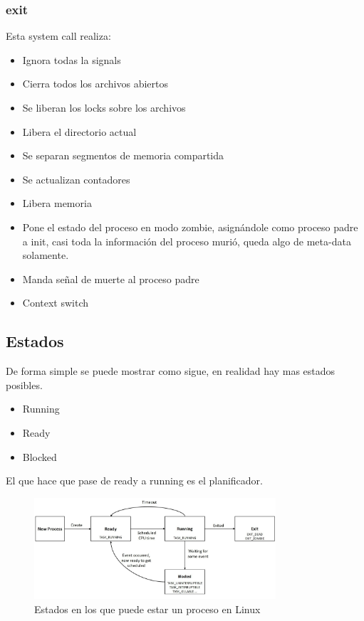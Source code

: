 \documentclass[titlepage,a4paper]{article}
\begin{document}
\subsubsection*{exit}
Esta system call realiza:
\begin{itemize}
    \item Ignora todas la signals
    \item Cierra todos los archivos abiertos
    \item Se liberan los locks sobre los archivos
    \item Libera el directorio actual
    \item Se separan segmentos de memoria compartida
    \item Se actualizan contadores
    \item Libera memoria
    \item Pone el estado del proceso en modo zombie, asignándole como proceso padre a init, casi toda la información del proceso murió, queda algo de meta-data solamente.
    \item Manda señal de muerte al proceso padre 
    \item Context switch
\end{itemize}



\subsection*{Estados}
De forma simple se puede mostrar como sigue, en realidad hay mas estados posibles.
\begin{itemize}
    \item Running
    \item Ready
    \item Blocked
\end{itemize}

El que hace que pase de ready a running es el planificador.

\begin{figure}[!htb]
    \centering
    \includegraphics[width=0.8\textwidth]{ImagenesApunte/EstadosLinux.png}
    \caption{Estados en los que puede estar un proceso en Linux}
\end{figure}
\end{document}
